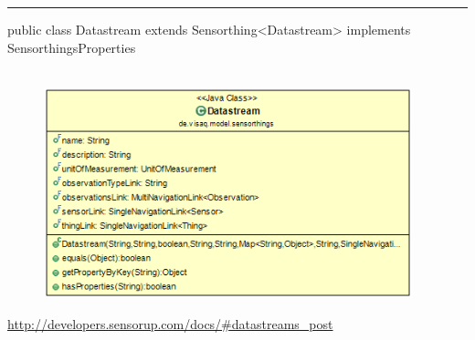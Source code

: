\rule{\textwidth}{0.4pt}
public class Datastream extends Sensorthing<Datastream> implements SensorthingsProperties
\\\\
\begin{minipage}{0.5\textwidth}
    \begin{figure}[H]
        {\centering\includegraphics[width=0.95\textwidth]{media/backend/modell/classes/Datastream.png}}
    \end{figure}
    \end{minipage} \hfill
\begin{minipage}{0.5\textwidth}
    \url{http://developers.sensorup.com/docs/#datastreams_post}
\end{minipage}

